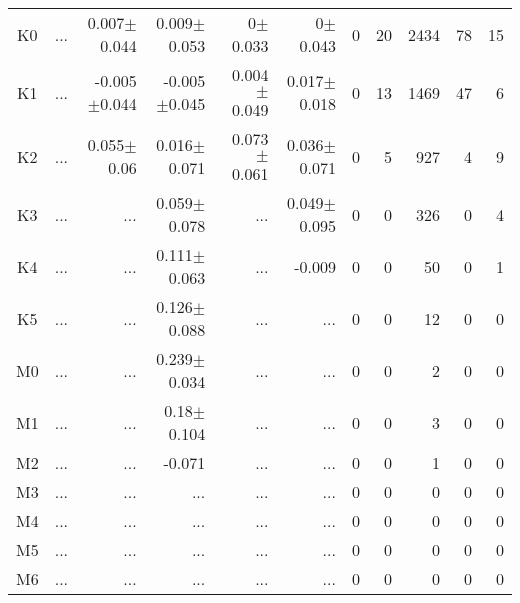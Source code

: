 \begin{table}[t]
\begin{center}
\begin{tabular}{c|rrrrr|rrrrr}
K0	&	 ...	&	0.007$\pm$0.044	&	0.009$\pm$0.053	&	0$\pm$0.033	&	0$\pm$0.043	&	0	&	20	&	2434	&	78	&	15	\\
K1	&	 ...	&	-0.005$\pm$0.044	&	-0.005$\pm$0.045	&	0.004$\pm$0.049	&	0.017$\pm$0.018	&	0	&	13	&	1469	&	47	&	6	\\
K2	&	 ...	&	0.055$\pm$0.06	&	0.016$\pm$0.071	&	0.073$\pm$0.061	&	0.036$\pm$0.071	&	0	&	5	&	927	&	4	&	9	\\
K3	&	 ...	&	 ...	&	0.059$\pm$0.078	&	 ...	&	0.049$\pm$0.095	&	0	&	0	&	326	&	0	&	4	\\
K4	&	 ...	&	 ...	&	0.111$\pm$0.063	&	 ...	&	-0.009	&	0	&	0	&	50	&	0	&	1	\\
K5	&	 ...	&	 ...	&	0.126$\pm$0.088	&	 ...	&	 ...	&	0	&	0	&	12	&	0	&	0	\\
M0	&	 ...	&	 ...	&	0.239$\pm$0.034	&	 ...	&	 ...	&	0	&	0	&	2	&	0	&	0	\\
M1	&	 ...	&	 ...	&	0.18$\pm$0.104	&	 ...	&	 ...	&	0	&	0	&	3	&	0	&	0	\\
M2	&	 ...	&	 ...	&	-0.071	&	 ...	&	 ...	&	0	&	0	&	1	&	0	&	0	\\
M3	&	 ...	&	 ...	&	 ...	&	 ...	&	 ...	&	0	&	0	&	0	&	0	&	0	\\
M4	&	 ...	&	 ...	&	 ...	&	 ...	&	 ...	&	0	&	0	&	0	&	0	&	0	\\
M5	&	 ...	&	 ...	&	 ...	&	 ...	&	 ...	&	0	&	0	&	0	&	0	&	0	\\
M6	&	 ...	&	 ...	&	 ...	&	 ...	&	 ...	&	0	&	0	&	0	&	0	&	0	\\
    \bottomrule
    \end{tabular}
\end{center}
\end{table}

